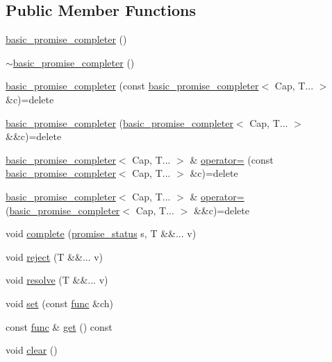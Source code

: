 \subsection*{Public Member Functions}
\begin{DoxyCompactItemize}
\item 
\hyperlink{classtelegen_1_1basic__promise__completer_a077149a13f4eef6d4201b972d158e5c8}{basic\+\_\+promise\+\_\+completer} ()
\item 
\hyperlink{classtelegen_1_1basic__promise__completer_afd43d4a7da2cd9da6b6ad4e56d6b9cff}{$\sim$basic\+\_\+promise\+\_\+completer} ()
\item 
\hyperlink{classtelegen_1_1basic__promise__completer_a86975693f5fb59c5feec43a82fdd0426}{basic\+\_\+promise\+\_\+completer} (const \hyperlink{classtelegen_1_1basic__promise__completer}{basic\+\_\+promise\+\_\+completer}$<$ Cap, T... $>$ \&c)=delete
\item 
\hyperlink{classtelegen_1_1basic__promise__completer_a700737fd96d72348a11da75d61617c60}{basic\+\_\+promise\+\_\+completer} (\hyperlink{classtelegen_1_1basic__promise__completer}{basic\+\_\+promise\+\_\+completer}$<$ Cap, T... $>$ \&\&c)=delete
\item 
\hyperlink{classtelegen_1_1basic__promise__completer}{basic\+\_\+promise\+\_\+completer}$<$ Cap, T... $>$ \& \hyperlink{classtelegen_1_1basic__promise__completer_a9a90ae35ae10c0a34f792748d2d6df12}{operator=} (const \hyperlink{classtelegen_1_1basic__promise__completer}{basic\+\_\+promise\+\_\+completer}$<$ Cap, T... $>$ \&c)=delete
\item 
\hyperlink{classtelegen_1_1basic__promise__completer}{basic\+\_\+promise\+\_\+completer}$<$ Cap, T... $>$ \& \hyperlink{classtelegen_1_1basic__promise__completer_adec620b895120563b905186a8612d9cb}{operator=} (\hyperlink{classtelegen_1_1basic__promise__completer}{basic\+\_\+promise\+\_\+completer}$<$ Cap, T... $>$ \&\&c)=delete
\item 
void \hyperlink{classtelegen_1_1basic__promise__completer_a4095e7affac30a83e7a82a1b74c76e66}{complete} (\hyperlink{namespacetelegen_a51e8b7480c7247182e2c6ca35e2c7504}{promise\+\_\+status} s, T \&\&... v)
\item 
void \hyperlink{classtelegen_1_1basic__promise__completer_ab6a8b85cfc515084a6791cd34c1bf0d9}{reject} (T \&\&... v)
\item 
void \hyperlink{classtelegen_1_1basic__promise__completer_a44debb763916840e1070a4141d48fb22}{resolve} (T \&\&... v)
\item 
void \hyperlink{classtelegen_1_1basic__promise__completer_a414f56ce6d13002656a789a5ebe86c2b}{set} (const \hyperlink{classtelegen_1_1basic__promise__completer_a0f689589e2a64063b01ea7a4268e8cfe}{func} \&ch)
\item 
const \hyperlink{classtelegen_1_1basic__promise__completer_a0f689589e2a64063b01ea7a4268e8cfe}{func} \& \hyperlink{classtelegen_1_1basic__promise__completer_a0346b1b3b620241a3c4ff384533c6b3d}{get} () const
\item 
void \hyperlink{classtelegen_1_1basic__promise__completer_a402470cdd51db55aafe9a342e5c807eb}{clear} ()
\end{DoxyCompactItemize}


